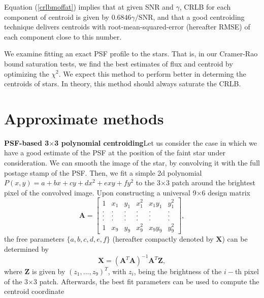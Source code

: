 \documentclass[12pt, preprint]{aastex}
\newcommand{\beq}{\begin{equation}}
\newcommand{\eeq}{\end{equation}}
\begin{document}
Equation (\ref{crlbmoffat}) implies that at given SNR and $\gamma$,
CRLB for each component of centroid is given by $0.6846\gamma/\text{SNR}$,
and that a good centroiding technique delivers centroids with
root-mean-squared-error (hereafter RMSE) of each component close to
this number.

We examine fitting an exact
 PSF profile to the stars. That is, in our Cramer-Rao bound saturation tests, we find the best
 estimates of flux and centroid by optimizing the $\chi^{2}$.
 We expect this method to perform better in determing the centroids
 of stars. In theory, this method should always saturate the CRLB. 
  
\section{Approximate methods}\label{sec:method}

\item{\bf  PSF-based 3$\times$3 polynomial centroiding}\quad Let us consider the case 
in which we have a good estimate of the PSF at
the position of the faint star under consideration. 
We can smooth the image of the star, by convolving it with the 
full postage stamp of the PSF. Then, we fit a simple 2d polynomial 
$P(x,y)=a+bx+cy+dx^2+exy+fy^2$ 
to the 3$\times$3 patch around the brightest pixel of the convolved image.
Upon constructing a universal 9$\times$6 design matrix
\begin{equation}
    \mathbf{A} = 
    \begin{bmatrix}
        1 & x_{1} & y_{1} & x_{1}^{2} & x_{1}y_{1} & y_{1}^{2} \\
        . & . & . & . & . & .  \\
        . & . & . & . & . & .  \\
        . & . & . & . & . & .  \\
        1 & x_{9} & y_{9} & x_{9}^{2} & x_{9}y_{9} & y_{9}^{2}
    \end{bmatrix},
\end{equation}
the free parameters $\{a,b,c,d,e,f\}$
(hereafter compactly denoted by $\mathbf{X}$) can be determined by 
\beq
\mathbf{X} = (\mathbf{A}^{T}\mathbf{A})^{-1}\mathbf{A}^{T}\mathbf{Z},
\label{linearfit}
\eeq
where $\mathbf{Z}$ is given by $(z_{1},...,z_{9})^{T}$,
with $z_{i}$, being the brightness of the $i-$th pixel of the 3$\times$3 patch.
Afterwards, the best fit parameters can be used to compute the centroid coordinate
\end{document}

